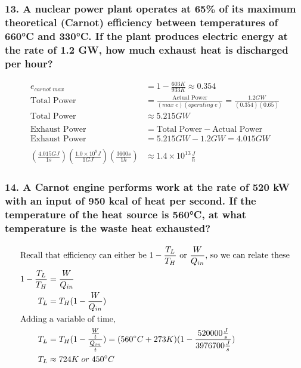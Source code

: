 \documentclass{article}
\begin{document}
\subsubsection*{
    13. A nuclear power plant operates at 65\% of its maximum
    theoretical (Carnot) efficiency between temperatures of 660°C
    and 330°C. If the plant produces electric energy at the rate of
    1.2 GW, how much exhaust heat is discharged per hour?
}
\begin{align*}
    e_{carnot\;max} &= 1 - \displaystyle\frac{603K}{933K} \approx 0.354 \\
    \text{Total Power} &= \displaystyle\frac{\text{Actual Power}}{(max\;
    e)(operating\;e)} = \displaystyle\frac{1.2
    GW}{(0.354)(0.65)} \\
    \text{Total Power} &\approx 5.215 GW \\\\
    \text{Exhaust Power} &= \text{Total Power} - \text{Actual Power} \\
    \text{Exhaust Power} &= 5.215 GW - 1.2GW = 4.015 GW \\\\
    (\displaystyle\frac{4.015 GJ}{1s})(\displaystyle\frac{1.0\times 10^9
J}{1GJ})(\displaystyle\frac{3600s}{1h}) &\approx 1.4\times 10^{13}
\displaystyle\frac{J}{h}
\end{align*}
\subsubsection*{
    14. A Carnot engine performs work at the rate of 520 kW
    with an input of 950 kcal of heat per second. If the
    temperature of the heat source is 560°C, at what temperature
    is the waste heat exhausted?
}
\begin{align*}
    \intertext{Recall that efficiency can either be $1 - 
    \displaystyle\frac{T_L}{T_H}$ or $\displaystyle\frac{W}{Q_{in}}$, so we can
    relate these}
    1 - \displaystyle\frac{T_L}{T_H} &= \displaystyle\frac{W}{Q_{in}} \\
    T_L &= T_H(1 - \displaystyle\frac{W}{Q_{in}}) \\
    \intertext{Adding a variable of time,}
    T_L &= T_H(1 - \displaystyle\frac{\frac{W}{t}}{\frac{Q_{in}}{t}}) =
    (560\degree C + 273K)(1- \displaystyle\frac{520000 \frac{J}{s}}{3976700
    \frac{J}{s}}) \\
    T_L &\approx 724K \;or\;450\degree C
\end{align*}
\end{document}
